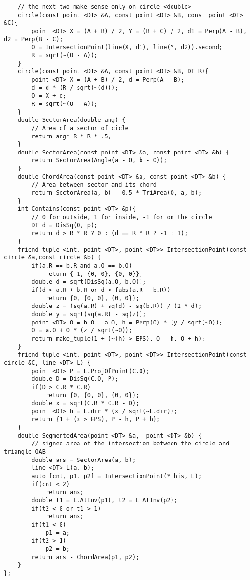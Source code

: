 \documentclass[10pt,a4paper,onesided]{article}
\begin{document}
\begin{multicols*}{3}
\begin{lstlisting}
    // the next two make sense only on circle <double>
    circle(const point <DT> &A, const point <DT> &B, const point <DT> &C){
        point <DT> X = (A + B) / 2, Y = (B + C) / 2, d1 = Perp(A - B), d2 = Perp(B - C);
        O = IntersectionPoint(line(X, d1), line(Y, d2)).second;
        R = sqrt(~(O - A));
    }
    circle(const point <DT> &A, const point <DT> &B, DT R){
        point <DT> X = (A + B) / 2, d = Perp(A - B);
        d = d * (R / sqrt(~(d)));
        O = X + d;
        R = sqrt(~(O - A));
    }
    double SectorArea(double ang) {
        // Area of a sector of cicle
        return ang* R * R * .5;
    }
    double SectorArea(const point <DT> &a, const point <DT> &b) {
        return SectorArea(Angle(a - O, b - O));
    }
    double ChordArea(const point <DT> &a, const point <DT> &b) {
        // Area between sector and its chord
        return SectorArea(a, b) - 0.5 * TriArea(O, a, b);
    }
    int Contains(const point <DT> &p){
        // 0 for outside, 1 for inside, -1 for on the circle
        DT d = DisSq(O, p);
        return d > R * R ? 0 : (d == R * R ? -1 : 1);
    }
    friend tuple <int, point <DT>, point <DT>> IntersectionPoint(const circle &a,const circle &b) {
        if(a.R == b.R and a.O == b.O)
            return {-1, {0, 0}, {0, 0}};
        double d = sqrt(DisSq(a.O, b.O));
        if(d > a.R + b.R or d < fabs(a.R - b.R))
            return {0, {0, 0}, {0, 0}};
        double z = (sq(a.R) + sq(d) - sq(b.R)) / (2 * d);
        double y = sqrt(sq(a.R) - sq(z));
        point <DT> O = b.O - a.O, h = Perp(O) * (y / sqrt(~O));
        O = a.O + O * (z / sqrt(~O));
        return make_tuple(1 + (~(h) > EPS), O - h, O + h);
    }
    friend tuple <int, point <DT>, point <DT>> IntersectionPoint(const circle &C, line <DT> L) {
        point <DT> P = L.ProjOfPoint(C.O);
        double D = DisSq(C.O, P);
        if(D > C.R * C.R)
            return {0, {0, 0}, {0, 0}};
        double x = sqrt(C.R * C.R - D); 
        point <DT> h = L.dir * (x / sqrt(~L.dir));
        return {1 + (x > EPS), P - h, P + h};
    } 
    double SegmentedArea(point <DT> &a,  point <DT> &b) {
        // signed area of the intersection between the circle and triangle OAB
        double ans = SectorArea(a, b);
        line <DT> L(a, b);
        auto [cnt, p1, p2] = IntersectionPoint(*this, L);
        if(cnt < 2)
            return ans;
        double t1 = L.AtInv(p1), t2 = L.AtInv(p2);
        if(t2 < 0 or t1 > 1)
            return ans;
        if(t1 < 0)
            p1 = a;
        if(t2 > 1)
            p2 = b;
        return ans - ChordArea(p1, p2);
    }
};
\end{lstlisting}

\end{multicols*}
\end{document}
